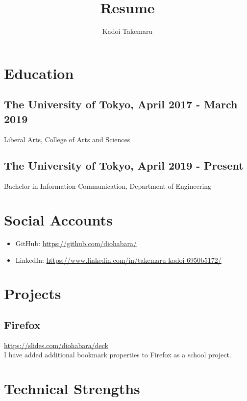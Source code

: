 \documentclass{article}
\title{Resume}
\author{Kadoi Takemaru}
\begin{document}
\maketitle

\section*{Education}
  \subsection*{The University of Tokyo, April 2017 - March 2019}
    Liberal Arts, College of Arts and Sciences
  \subsection*{The University of Tokyo, April 2019 - Present}
    Bachelor in Information Communication, Department of Engineering

\section*{Social Accounts}
  \begin{itemize}
    \item GitHub: \url{https://github.com/diohabara/}
    \item LinkedIn: \url{https://www.linkedin.com/in/takemaru-kadoi-6950b5172/}
  \end{itemize}
  

\section*{Projects}
  \subsection*{Firefox}
    \url{https://slides.com/diohabara/deck}
    \\ I have added additional bookmark properties to Firefox as a school project.


\section*{Technical Strengths}
\end{document}
